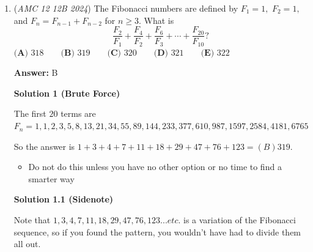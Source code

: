 \begin{enumerate}
 (5)  $(x_1,x_2,x_3)  = (-1,-2,-3) , b = 11, a=6$ invalid 

 the total event space is $21  \cdot (21- 1)$ (choice of select a times choice of selecting b given no-replacement) 

 hence, our answer is $\frac{4}{21 \cdot 20} =   \boxed{\textbf{(C) }\frac{1}{105}}$




\textbf{Solution 1.1 (desperation)}

As obtained in Solution 1, we get that there are $P(21,2) = 420$ equally likely ordered pairs $(a,b)$, which means that the denominator will likely be a factor of 420, which leaves answers C and D, and if you are lucky enough, you can guess that the answer is $\boxed{\textbf{(C) }\frac{1}{105}}$. If you're not lucky enough, however, that's a math instinct skill issue, and I recommend you get instinct first before you do math. 

 


	\item (\textit{AMC 12 12B 2024}) The Fibonacci numbers are defined by $F_1=1,$ $F_2=1,$ and $F_n=F_{n-1}+F_{n-2}$ for $n\geq 3.$ What is
 \[\dfrac{F_2}{F_1}+\dfrac{F_4}{F_2}+\dfrac{F_6}{F_3}+\cdots+\dfrac{F_{20}}{F_{10}}?\]
$\textbf{(A) }318 \qquad\textbf{(B) }319\qquad\textbf{(C) }320\qquad\textbf{(D) }321\qquad\textbf{(E) }322$

 \textbf{Answer: }B



\textbf{Solution 1 (Brute Force)}

The first $20$ terms are $F_n = 1, 1, 2, 3, 5, 8, 13, 21, 34, 55, 89, 144, 233, 377, 610, 987, 1597, 2584, 4181, 6765$

 So the answer is $1 +  3 + 4 + 7 + 11 + 18 + 29 + 47 + 76 + 123 =  \boxed{(B) 319}$. 

 
            \begin{itemize}
        \item Do not do this unless you have no other option or no time to find a smarter way
            \end{itemize}
            



\textbf{Solution 1.1 (Sidenote)}

Note that $1, 3, 4, 7, 11, 18, 29, 47, 76, 123... etc.$ is a variation of the Fibonacci sequence, so if you found the pattern, you wouldn't have had to divide them all out.

 




\end{enumerate}
